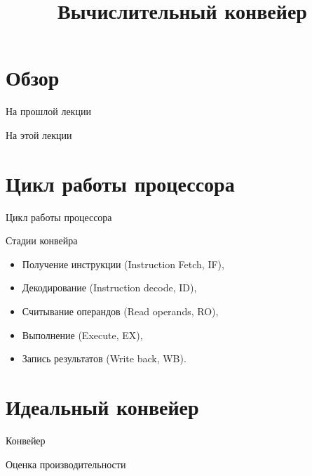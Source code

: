 

\title{Вычислительный конвейер}



\begin{frame}
\titlepage
\end{frame}

\section*{Обзор}

\begin{frame}{На прошлой лекции}
\end{frame}

\begin{frame}{На этой лекции}
\tableofcontents
\end{frame}

\section{Цикл работы процессора}

\begin{frame}{Цикл работы процессора}
\centering
{}
\end{frame}

\begin{frame}{Стадии конвейра}
\begin{itemize}
    \item Получение инструкции (Instruction Fetch, IF),
    \item Декодирование (Instruction decode, ID),
    \item Считывание операндов (Read operands, RO),
    \item Выполнение (Execute, EX),
    \item Запись результатов (Write back, WB).
\end{itemize}
\end{frame}

\section{Идеальный конвейер}

\begin{frame}{Конвейер}
\centering
{}
\end{frame}

\begin{frame}{Оценка производительности}
\end{frame}

